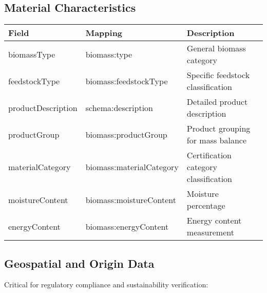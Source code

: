 \documentclass{article}
\begin{document}
\subsection{Material Characteristics}

\begin{longtable}{|p{3.5cm}|p{3cm}|p{7.5cm}|}
\hline
\textbf{Field} & \textbf{Mapping} & \textbf{Description} \\
\hline
biomassType & biomass:type & General biomass category \\
feedstockType & biomass:feedstockType & Specific feedstock classification \\
productDescription & schema:description & Detailed product description \\
productGroup & biomass:productGroup & Product grouping for mass balance \\
materialCategory & biomass:materialCategory & Certification category classification \\
moistureContent & biomass:moistureContent & Moisture percentage \\
energyContent & biomass:energyContent & Energy content measurement \\
\hline
\end{longtable}

\subsection{Geospatial and Origin Data}

Critical for regulatory compliance and sustainability verification:
\end{document}
